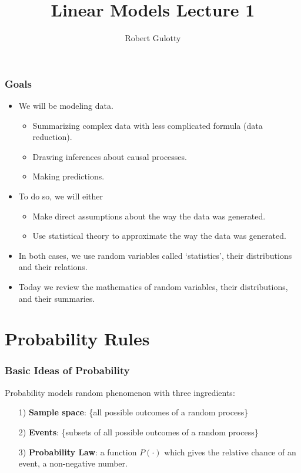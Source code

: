 \documentclass[aspectratio=169, handout]{beamer}
\title[PLSC 30700]{Linear Models Lecture 1}
\author{Robert Gulotty}
\institute[Chicago]{University of Chicago}
\numberwithin{equation}{section}
\begin{document}
\begin{frame}
\maketitle
\end{frame}



\begin{frame}
\frametitle{Goals}
\begin{itemize}
\item We will be modeling data.
\begin{itemize}
\item Summarizing complex data with less complicated formula (data reduction).
\item Drawing inferences about causal processes.
\item Making predictions.
\end{itemize}
\item To do so, we will either
\begin{itemize}
\item Make direct assumptions about the way the data was generated.
\item Use statistical theory to approximate the way the data was generated.
\end{itemize}
\item  In both cases, we use random variables called `statistics', their distributions and their relations.
\item Today we review the mathematics of random variables, their distributions, and their summaries.
\end{itemize}
\end{frame}


\section{Probability Rules}
\begin{frame}
\frametitle{Basic Ideas of Probability}

Probability models random phenomenon with three ingredients:\pause 
\begin{itemize}
\item[1)] \textbf{Sample space}: \{all possible outcomes of a random process\} \pause 
\item[2)] \textbf{Events}: \{subsets of all possible outcomes of a random process\} \pause 
\item[3)] \textbf{Probability Law}: a function $P(\cdot)$ which gives the relative chance of an event, a non-negative number.
\end{itemize}
\end{frame}
\end{document}
